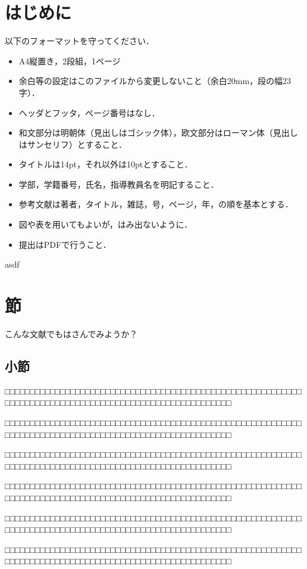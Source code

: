 

\section{はじめに}
以下のフォーマットを守ってください．
\begin{itemize}
\item
A4縦置き，2段組，1ページ
\item
余白等の設定はこのファイルから変更しないこと（余白20mm，段の幅23字）．
\item
ヘッダとフッタ，ページ番号はなし．
\item
和文部分は明朝体（見出しはゴシック体），欧文部分はローマン体（見出しはサンセリフ）とすること．
\item
タイトルは14pt，それ以外は10ptとすること．
\item
学部，学籍番号，氏名，指導教員名を明記すること．
\item
参考文献は著者，タイトル，雑誌，号，ページ，年，の順を基本とする．
\item
図や表を用いてもよいが，はみ出ないように．
\item
提出はPDFで行うこと．
\end{itemize}
asdf
\section{節}
こんな文献でもはさんでみようか\cite{Arakawa96}？
\subsection{小節}

□□□□□□□□□□□□□□□□□□□□□□□□□□□□□□□□□□□□□□□□□□□□□□□□□□□□□□□□□□□□□□□□□□□□□□□□□□□□□□□□□□□□□□□□□□□□□□□□□□□□□□□□

□□□□□□□□□□□□□□□□□□□□□□□□□□□□□□□□□□□□□□□□□□□□□□□□□□□□□□□□□□□□□□□□□□□□□□□□□□□□□□□□□□□□□□□□□□□□□□□□□□□□□□□□

□□□□□□□□□□□□□□□□□□□□□□□□□□□□□□□□□□□□□□□□□□□□□□□□□□□□□□□□□□□□□□□□□□□□□□□□□□□□□□□□□□□□□□□□□□□□□□□□□□□□□□□□

□□□□□□□□□□□□□□□□□□□□□□□□□□□□□□□□□□□□□□□□□□□□□□□□□□□□□□□□□□□□□□□□□□□□□□□□□□□□□□□□□□□□□□□□□□□□□□□□□□□□□□□□

□□□□□□□□□□□□□□□□□□□□□□□□□□□□□□□□□□□□□□□□□□□□□□□□□□□□□□□□□□□□□□□□□□□□□□□□□□□□□□□□□□□□□□□□□□□□□□□□□□□□□□□□

□□□□□□□□□□□□□□□□□□□□□□□□□□□□□□□□□□□□□□□□□□□□□□□□□□□□□□□□□□□□□□□□□□□□□□□□□□□□□□□□□□□□□□□□□□□□□□□□□□□□□□□□

